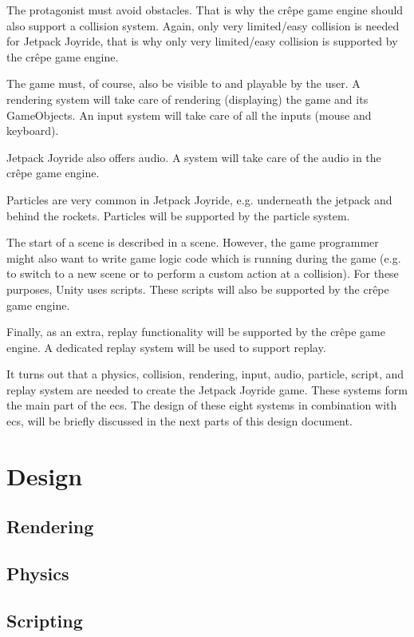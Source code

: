 \documentclass{projdoc}
\begin{document}
The protagonist must avoid obstacles. That is why the cr\^epe game engine should also
support a collision system. Again, only very limited/easy collision is needed for
Jetpack Joyride, that is why only very limited/easy collision is supported by the
cr\^epe game engine.

The game must, of course, also be visible to and playable by the user. A rendering
system will take care of rendering (displaying) the game and its GameObjects. An
input system will take care of all the inputs (mouse and keyboard).

Jetpack Joyride also offers audio. A system will take care of the audio in the
cr\^epe game engine.

Particles are very common in Jetpack Joyride, e.g. underneath the jetpack and behind
the rockets. Particles will be supported by the particle system.

The start of a scene is described in a scene. However, the game programmer might also
want to write game logic code which is running during the game (e.g. to switch to a
new scene or to perform a custom action at a collision). For these purposes, Unity
uses scripts. These scripts will also be supported by the cr\^epe game engine.

Finally, as an extra, replay functionality will be supported by the cr\^epe game
engine. A dedicated replay system will be used to support replay.

It turns out that a physics, collision, rendering, input, audio, particle, script,
and replay system are needed to create the Jetpack Joyride game. These systems form
the main part of the \gls{ecs}. The design of these eight systems in combination with
\gls{ecs}, will be briefly discussed in the next parts of this design document.

\section{Design}

\subsection{Rendering}

\subsection{Physics}

\subsection{Scripting}
\end{document}
